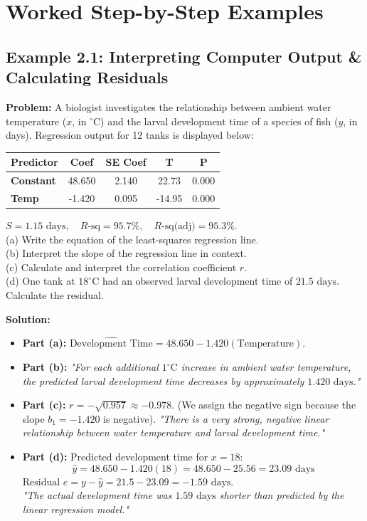 \section{Worked Step-by-Step Examples}

\subsection*{Example 2.1: Interpreting Computer Output & Calculating Residuals}
\textbf{Problem:} A biologist investigates the relationship between ambient water temperature ($x$, in $^\circ\text{C}$) and the larval development time of a species of fish ($y$, in days). Regression output for 12 tanks is displayed below:
\begin{center}
\begin{tabular}{lcccc}
\toprule
\textbf{Predictor} & \textbf{Coef} & \textbf{SE Coef} & \textbf{T} & \textbf{P} \\
\midrule
\textbf{Constant} & 48.650 & 2.140 & 22.73 & 0.000 \\
\textbf{Temp} & -1.420 & 0.095 & -14.95 & 0.000 \\
\bottomrule
\end{tabular}
\end{center}
$S = 1.15\text{ days}, \quad R\text{-sq} = 95.7\%, \quad R\text{-sq(adj)} = 95.3\%$.\\
(a) Write the equation of the least-squares regression line.\\
(b) Interpret the slope of the regression line in context.\\
(c) Calculate and interpret the correlation coefficient $r$.\\
(d) One tank at $18^\circ\text{C}$ had an observed larval development time of $21.5\text{ days}$. Calculate the residual.

\textbf{Solution:}
\begin{itemize}[leftmargin=1.2em]
  \item \textbf{Part (a):} $\widehat{\text{Development Time}} = 48.650 - 1.420(\text{Temperature})$.
  \item \textbf{Part (b):} \textit{"For each additional $1^\circ\text{C}$ increase in ambient water temperature, the predicted larval development time decreases by approximately $1.420\text{ days}$."}
  \item \textbf{Part (c):} $r = -\sqrt{0.957} \approx -0.978$. (We assign the negative sign because the slope $b_1 = -1.420$ is negative).
  \textit{"There is a very strong, negative linear relationship between water temperature and larval development time."}
  \item \textbf{Part (d):} Predicted development time for $x = 18$:
  \[ \hat{y} = 48.650 - 1.420(18) = 48.650 - 25.56 = 23.09\text{ days} \]
  $\text{Residual } e = y - \hat{y} = 21.5 - 23.09 = -1.59\text{ days}$.\\
  \textit{"The actual development time was $1.59\text{ days}$ shorter than predicted by the linear regression model."}
\end{itemize}

